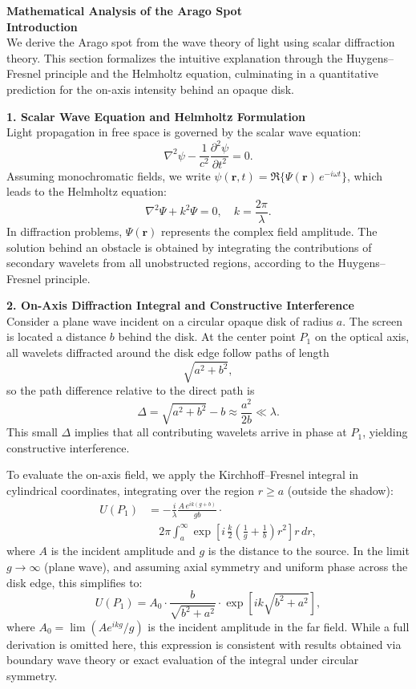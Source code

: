 \begin{technical}
{\Large\textbf{Mathematical Analysis of the Arago Spot}}\\[0.7em]

\noindent\textbf{Introduction}\\[0.5em]
We derive the Arago spot from the wave theory of light using scalar diffraction theory. This section formalizes the intuitive explanation through the Huygens–Fresnel principle and the Helmholtz equation, culminating in a quantitative prediction for the on-axis intensity behind an opaque disk.

\noindent\textbf{1. Scalar Wave Equation and Helmholtz Formulation}\\[0.5em]
Light propagation in free space is governed by the scalar wave equation:
\[
\nabla^2 \psi - \frac{1}{c^2} \frac{\partial^2 \psi}{\partial t^2} = 0.
\]
Assuming monochromatic fields, we write $\psi(\mathbf{r},t) = \Re\{\Psi(\mathbf{r})\,e^{-i\omega t}\}$, which leads to the Helmholtz equation:
\[
\nabla^2 \Psi + k^2 \Psi = 0, \quad k = \frac{2\pi}{\lambda}.
\]
In diffraction problems, $\Psi(\mathbf{r})$ represents the complex field amplitude. The solution behind an obstacle is obtained by integrating the contributions of secondary wavelets from all unobstructed regions, according to the Huygens–Fresnel principle.

\noindent\textbf{2. On-Axis Diffraction Integral and Constructive Interference}\\[0.5em]
Consider a plane wave incident on a circular opaque disk of radius $a$. The screen is located a distance $b$ behind the disk. At the center point $P_1$ on the optical axis, all wavelets diffracted around the disk edge follow paths of length
\[
\sqrt{a^2 + b^2},
\]
so the path difference relative to the direct path is
\[
\Delta = \sqrt{a^2 + b^2} - b \approx \frac{a^2}{2b} \ll \lambda.
\]
This small $\Delta$ implies that all contributing wavelets arrive in phase at $P_1$, yielding constructive interference.

To evaluate the on-axis field, we apply the Kirchhoff–Fresnel integral in cylindrical coordinates, integrating over the region $r \ge a$ (outside the shadow):
\begin{align}
U(P_1) &= -\frac{i}{\lambda} \frac{A\,e^{ik(g+b)}}{gb} \cdot \\
&\quad 2\pi \int_{a}^{\infty} \exp\left[ i\,\frac{k}{2} \left(\frac{1}{g} + \frac{1}{b}\right) r^2 \right] r\,dr, 
\end{align}
where $A$ is the incident amplitude and $g$ is the distance to the source. In the limit $g \to \infty$ (plane wave), and assuming axial symmetry and uniform phase across the disk edge, this simplifies to:
\[
U(P_1) = A_0 \cdot \frac{b}{\sqrt{b^2 + a^2}} \cdot \exp\left[ ik\sqrt{b^2 + a^2} \right],
\]
where $A_0 = \lim (A e^{ikg} / g)$ is the incident amplitude in the far field. While a full derivation is omitted here, this expression is consistent with results obtained via boundary wave theory or exact evaluation of the integral under circular symmetry.


\end{technical}
